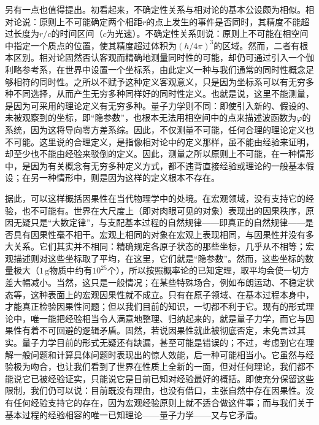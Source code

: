 \documentclass[fontsize=13pt,twoside,openany,headings=normal,parskip=false,bookmarkpackage=false,DIV=calc]{scrbook}
\begin{document}
另有一点也值得提出。初看起来，不确定性关系与相对论的基本公设颇为相似。相对论说：原则上不可能确定两个相距$r$的点上发生的事件是否同时，其精度不能超过长度为$r/c$的时间区间（$c$为光速）。\hypertarget{origpage-172}{}\label{origpage-172}不确定性关系则说：原则上不可能在相空间中指定一个质点的位置，使其精度超过体积为$(h/4\pi)^3$的区域。然而，二者有根本区别。相对论固然否认客观而精确地测量同时性的可能，却仍可通过引入一个伽利略参考系，在世界中设置一个坐标系，由此定义一种与我们通常的同时性概念足够相符的同时性。之所以不赋予这种定义客观意义，只是因为坐标系可以有无穷多种不同选择，从而产生无穷多种同样好的同时性定义。也就是说，这里不能测量，是因为可采用的理论定义有无穷多种。量子力学则不同：即使引入新的、假设的、未被观察到的坐标，即“隐参数”，也根本无法用相空间中的点来描述波函数为$\varphi$的系统，因为这将导向零方差系综。因此，不仅测量不可能，任何合理的理论定义也不可能。这里说的合理定义，是指像相对论中的定义那样，虽不能由经验来证明，却至少也不能由经验来驳倒的定义。因此，测量之所以原则上不可能，在一种情形中，是因为有关概念有无穷多种定义方式，都不违背直接经验或理论的一般基本假设；在另一种情形中，则是因为这样的定义根本不存在。

据此，可以这样概括因果性在当代物理学中的处境。在宏观领域，没有支持它的经验，也不可能有。世界在大尺度上（即对肉眼可见的对象）表现出的因果秩序，原因无疑只是“大数定律”，与支配基本过程的自然规律——即真正的自然规律——是否具有因果性毫不相干。宏观上相同的对象在宏观上表现相同，与因果性并没有多大关系。它们其实并不相同：精确规定各原子状态的那些坐标，几乎从不相等；宏观描述则对这些坐标取了平均，在这里，它们就是“隐参数”。然而，这些坐标的数量极大（$1\,\mathrm g$物质中约有$10^{25}$个），所以按照概率论的已知定理，取平均会使一切方差大幅减小。当然，这只是一般情况；在某些特殊场合，例如布朗运动、不稳定状态等，这种表面上的宏观因果性就不成立。只有在原子领域、在基本过程本身中，才能真正检验\hypertarget{origpage-173}{}\label{origpage-173}因果性问题；但以我们目前的知识，一切都不利于它。现有的形式理论中，唯一能把经验相当令人满意地整理、归纳起来的，就是量子力学，而它与因果性有着不可回避的逻辑矛盾。固然，若说因果性就此被彻底否定，未免言过其实。量子力学目前的形式无疑还有缺漏，甚至可能是错误的；不过，考虑到它在理解一般问题和计算具体问题时表现出的惊人效能，后一种可能相当小。它虽然与经验极为吻合，也让我们看到了世界在性质上全新的一面，但对任何理论，我们都不能说它已被经验证实，只能说它是目前已知对经验最好的概括。即使充分保留这些限制，我们仍可以说：目前既没有理由，也没有借口，主张自然中存在因果性。没有任何经验支持它的存在，因为宏观经验原则上就不适合做这件事；而与我们关于基本过程的经验相容的唯一已知理论——量子力学——又与它矛盾。
\end{document}
